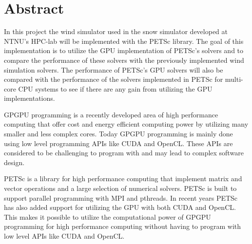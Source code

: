 \section*{Abstract}

In this project the wind simulator used in the snow simulator developed at
NTNU's HPC-lab will be implemented with the PETSc library. The goal of this
implementation is to utilize the GPU implementation of PETSc's solvers and to
compare the performance of these solvers with the previously implemented wind
simulation solvers. The performance of PETSc's GPU solvers will also be compared
with the performance of the solvers implemented in PETSc for multi-core CPU
systems to see if there are any gain from utilizing the GPU implementations.

GPGPU programming is a recently developed area of high performance computing that
offer cost and energy efficient computing power by utilizing many smaller and less
complex cores. Today GPGPU programming is mainly done using low level programming
APIs like CUDA and OpenCL. These APIs are considered to be challenging to
program with and may lead to complex software design.

PETSc is a library for high performance computing that implement matrix and vector
operations and a large selection of numerical solvers. PETSc is built to support
parallel programming with MPI and pthreads. In recent years PETSc has also added
support for utilizing the GPU with both CUDA and OpenCL. This makes it possible
to utilize the computational power of GPGPU programming for high performance
computing without having to program with low level APIs like CUDA and OpenCL.
